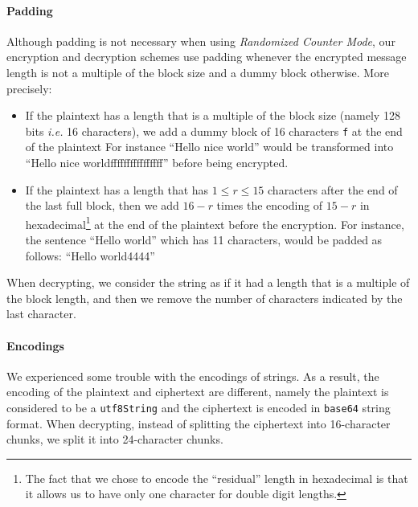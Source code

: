 \documentclass[10pt,twocolumn]{article}
\begin{document}
\paragraph{Padding}
Although padding is not necessary when using \emph{Randomized Counter Mode}, our encryption and 
decryption schemes use padding whenever the encrypted message length is not a multiple of the block size and a dummy block otherwise. More precisely:
\begin{itemize}
\item If the plaintext has a length that is a multiple of the block size (namely 128 bits \emph{i.e.} 16 characters), we add a dummy block of 16 characters \texttt{f} at the end of the plaintext
For instance ``Hello nice world'' would be transformed into ``Hello nice worldffffffffffffffff'' before being encrypted.
\item If the plaintext has a length that has $1 \leq r \leq 15$ characters after the end of the last full block, then we add $16-r$ times the encoding of $15-r$ in hexadecimal\footnote{The fact that we chose to encode the “residual” length in hexadecimal is that it allows us to have only one character for double digit lengths.} at the end of the plaintext before the encryption.
For instance, the sentence ``Hello world'' which has 11 characters, would be padded as follows: ``Hello world4444''
\end{itemize}
When decrypting, we consider the string as if it had a length that is a multiple of the block length, and then we remove the number of characters indicated by the last character.

\paragraph{Encodings}
We experienced some trouble with the encodings of strings. As a result, the encoding of the plaintext and ciphertext are different, namely the plaintext is considered to be a \texttt{utf8String} and the ciphertext is encoded in \texttt{base64} string format. When decrypting, instead of splitting the ciphertext into 16-character chunks, we split it into 24-character chunks.



\end{document}
